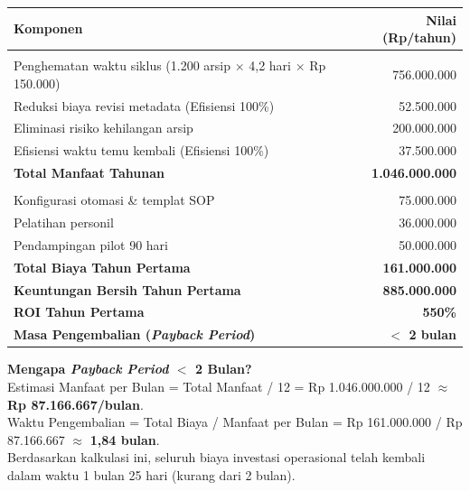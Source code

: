 \documentclass[12pt,a4paper]{report}
\begin{document}
\vspace{0.2cm}
\noindent
\small
\begin{tabularx}{\textwidth}{@{} >{\raggedright\arraybackslash}X r @{}}
\toprule
\textbf{Komponen} & \textbf{Nilai (Rp/tahun)} \\
\midrule
\multicolumn{2}{@{}l}{\textbf{\color{plnblue}Penghematan (Manfaat)}} \\
\quad Penghematan waktu siklus (1.200 arsip $\times$ 4,2 hari $\times$ Rp 150.000) & 756.000.000 \\
\quad Reduksi biaya revisi metadata (Efisiensi 100\%) & 52.500.000 \\
\quad Eliminasi risiko kehilangan arsip & 200.000.000 \\
\quad Efisiensi waktu temu kembali (Efisiensi 100\%) & 37.500.000 \\
\addlinespace
\textbf{Total Manfaat Tahunan} & \textbf{1.046.000.000} \\
\addlinespace
\multicolumn{2}{@{}l}{\textbf{\color{red}Biaya Implementasi -- Tahun Pertama}} \\
\quad Konfigurasi otomasi \& templat SOP & 75.000.000 \\
\quad Pelatihan personil & 36.000.000 \\
\quad Pendampingan pilot 90 hari & 50.000.000 \\
\addlinespace
\textbf{Total Biaya Tahun Pertama} & \textbf{161.000.000} \\
\midrule
\textbf{Keuntungan Bersih Tahun Pertama} & \textbf{885.000.000} \\
\textbf{ROI Tahun Pertama} & \textbf{550\%} \\
\textbf{Masa Pengembalian (\textit{Payback Period})} & \textbf{$<$ 2 bulan} \\
\bottomrule
\end{tabularx}

\begin{plnbox}
\small
\textbf{Mengapa \textit{Payback Period} $<$ 2 Bulan?} \\
Estimasi Manfaat per Bulan = Total Manfaat / 12 = Rp 1.046.000.000 / 12 $\approx$ \textbf{Rp 87.166.667/bulan}. \\
Waktu Pengembalian = Total Biaya / Manfaat per Bulan = Rp 161.000.000 / Rp 87.166.667 $\approx$ \textbf{1,84 bulan}. \\
Berdasarkan kalkulasi ini, seluruh biaya investasi operasional telah kembali dalam waktu 1 bulan 25 hari (kurang dari 2 bulan).
\end{plnbox}
\end{document}
